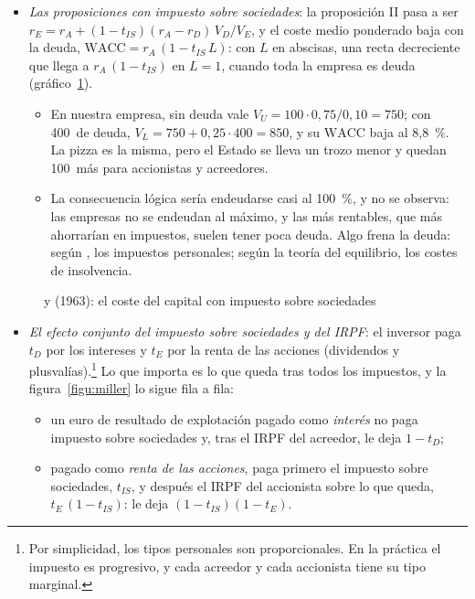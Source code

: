 \documentclass[11pt]{article}
\begin{document}
\begin{itemize}
\item \emph{Las proposiciones con impuesto sobre sociedades}: la proposición II pasa a ser $r_E=r_A+(1-t_{IS})(r_A-r_D)\,V_D/V_E$, y el coste medio ponderado baja con la deuda, $\mathrm{WACC}=r_A\,(1-t_{IS}\,L)$: con $L$ en abscisas, una recta decreciente que llega a $r_A\,(1-t_{IS})$ en $L=1$, cuando toda la empresa es deuda (gráfico~\ref{fig:coste-mm-is}).
  \begin{itemize}
  \item En nuestra empresa, sin deuda vale $V_U=100\cdot0{,}75/0{,}10=750$; con 400~de deuda, $V_L=750+0{,}25\cdot400=850$, y su $\mathrm{WACC}$ baja al 8,8~\%. La pizza es la misma, pero el Estado se lleva un trozo menor y quedan 100~más para accionistas y acreedores.
  \item La consecuencia lógica sería endeudarse casi al 100~\%, y no se observa: las empresas no se endeudan al máximo, y las más rentables, que más ahorrarían en impuestos, suelen tener poca deuda. Algo frena la deuda: según , los impuestos personales; según la teoría del equilibrio, los costes de insolvencia.
  \end{itemize}
\end{itemize}

\begin{figure}[H]
\centering
\caption{ y  (1963): el coste del capital con impuesto sobre sociedades}\label{fig:coste-mm-is}
\end{figure}

\begin{itemize}
\item \emph{El efecto conjunto del impuesto sobre sociedades y del IRPF}\nocite{Miller1977Debt}: el inversor paga $t_D$ por los intereses y $t_E$ por la renta de las acciones (dividendos y plusvalías).\footnote{Por simplicidad, los tipos personales son proporcionales. En la práctica el impuesto es progresivo, y cada acreedor y cada accionista tiene su tipo marginal.} Lo que importa es lo que queda tras todos los impuestos, y la figura~\ref{figu:miller} lo sigue fila a fila:
  \begin{itemize}
  \item un euro de resultado de explotación pagado como \emph{interés} no paga impuesto sobre sociedades y, tras el IRPF del acreedor, le deja $1-t_D$;
  \item pagado como \emph{renta de las acciones}, paga primero el impuesto sobre sociedades, $t_{IS}$, y después el IRPF del accionista sobre lo que queda, $t_E\,(1-t_{IS})$: le deja $(1-t_{IS})(1-t_E)$.
  \end{itemize}
\end{itemize}
\end{document}
